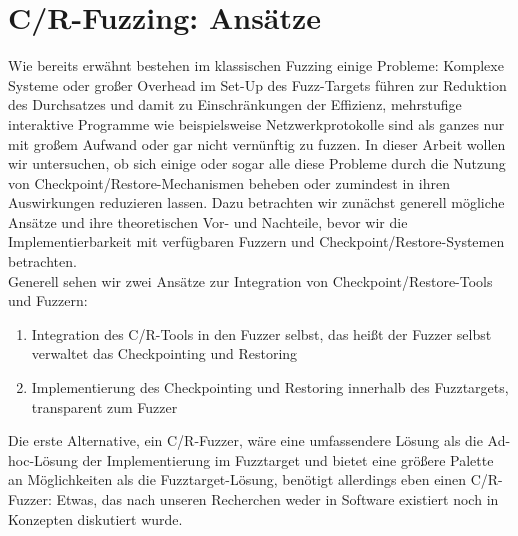 \documentclass[a4paper]{article}
\begin{document}
\section{C/R-Fuzzing: Ansätze}
Wie bereits erwähnt bestehen im klassischen Fuzzing einige Probleme: Komplexe Systeme oder großer Overhead im Set-Up des Fuzz-Targets führen zur Reduktion des Durchsatzes und damit zu Einschränkungen der Effizienz, mehrstufige interaktive Programme wie beispielsweise Netzwerkprotokolle sind als ganzes nur mit großem Aufwand oder gar nicht vernünftig zu fuzzen. 
In dieser Arbeit wollen wir untersuchen, ob sich einige oder sogar alle diese Probleme durch die Nutzung von Checkpoint/Restore-Mechanismen beheben oder zumindest in ihren Auswirkungen reduzieren lassen. 
Dazu betrachten wir zunächst generell mögliche Ansätze und ihre theoretischen Vor- und Nachteile, bevor wir die Implementierbarkeit mit verfügbaren Fuzzern und Checkpoint/Restore-Systemen betrachten.\\
Generell sehen wir zwei Ansätze zur Integration von Checkpoint/Restore-Tools und Fuzzern:
\begin{enumerate}
    \item Integration des C/R-Tools in den Fuzzer selbst, das heißt der Fuzzer selbst verwaltet das Checkpointing und Restoring
    \item Implementierung des Checkpointing und Restoring innerhalb des Fuzztargets, transparent zum Fuzzer
\end{enumerate}
Die erste Alternative, ein C/R-Fuzzer, wäre eine umfassendere Lösung als die Ad-hoc-Lösung der Implementierung im Fuzztarget und bietet eine größere Palette an Möglichkeiten als die Fuzztarget-Lösung, benötigt allerdings eben einen C/R-Fuzzer: Etwas, das nach unseren Recherchen weder in Software existiert noch in Konzepten diskutiert wurde.\\
\end{document}
